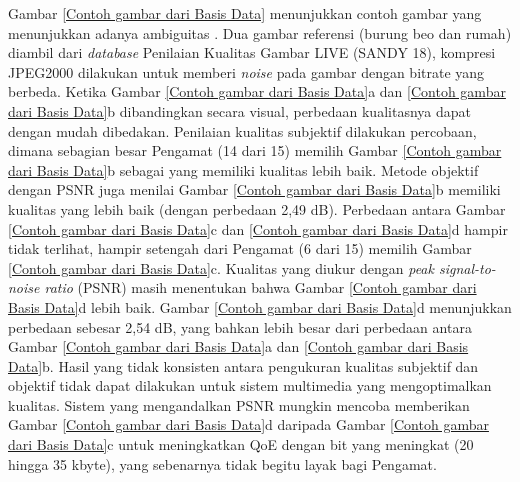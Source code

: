 Gambar \ref{Contoh gambar dari Basis Data} menunjukkan contoh gambar yang menunjukkan adanya ambiguitas \citep{Cheon2016}. Dua gambar referensi (burung beo dan rumah) diambil dari \textit{database} Penilaian Kualitas Gambar LIVE (SANDY 18), kompresi JPEG2000 dilakukan untuk memberi \textit{noise} pada gambar dengan bitrate yang berbeda. Ketika Gambar \ref{Contoh gambar dari Basis Data}a dan \ref{Contoh gambar dari Basis Data}b dibandingkan secara visual, perbedaan kualitasnya dapat dengan mudah dibedakan. Penilaian kualitas subjektif dilakukan percobaan, dimana sebagian besar Pengamat (14 dari 15) memilih Gambar \ref{Contoh gambar dari Basis Data}b sebagai yang memiliki kualitas lebih baik. Metode objektif dengan PSNR juga menilai Gambar \ref{Contoh gambar dari Basis Data}b memiliki kualitas yang lebih baik (dengan perbedaan 2,49 dB). Perbedaan antara Gambar \ref{Contoh gambar dari Basis Data}c dan \ref{Contoh gambar dari Basis Data}d hampir tidak terlihat, hampir setengah dari Pengamat (6 dari 15) memilih Gambar \ref{Contoh gambar dari Basis Data}c. Kualitas yang diukur dengan \textit{peak signal-to-noise ratio} (PSNR) masih menentukan bahwa Gambar \ref{Contoh gambar dari Basis Data}d lebih baik. Gambar \ref{Contoh gambar dari Basis Data}d menunjukkan perbedaan sebesar 2,54 dB, yang bahkan lebih besar dari perbedaan antara Gambar \ref{Contoh gambar dari Basis Data}a dan \ref{Contoh gambar dari Basis Data}b. Hasil yang tidak konsisten antara pengukuran kualitas subjektif dan objektif tidak dapat dilakukan untuk sistem multimedia yang mengoptimalkan kualitas. Sistem yang mengandalkan PSNR mungkin mencoba memberikan Gambar \ref{Contoh gambar dari Basis Data}d daripada Gambar \ref{Contoh gambar dari Basis Data}c untuk meningkatkan QoE dengan bit yang meningkat (20 hingga 35 kbyte), yang sebenarnya tidak begitu layak bagi Pengamat.

